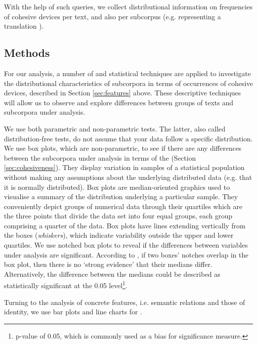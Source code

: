 \documentclass[output=paper]{langsci/langscibook.cls}
\begin{document}
With the help of such queries, we collect distributional information on frequencies of cohesive devices per text, and also per subcorpus (e.g. representing a translation ).



\subsection{Methods}\label{sec:method}

For our analysis, a number of  and statistical techniques are applied to investigate the dis\-tri\-bu\-tional characteristics of subcorpora in terms of occurrences of cohesive devices, described in Section \ref{sec:features} above. These descriptive techniques will allow us to observe and explore differences between groups of texts and subcorpora under analysis.

We use both parametric and non-parametric tests. The latter, also called dis\-tri\-bu\-tion-free tests, do not assume that your data follow a specific distribution. We use box plots, which are non-parametric, to see if there are any differences between the subcorpora under analysis in terms of the  (Section \ref{sec:cohesiveness}). They display variation in samples of a statistical population without making any assumptions about the underlying distributed data (e.g. that it is normally distributed). Box plots are median-oriented graphics used to visualise a summary of the distribution underlying a particular sample. They conveniently depict groups of numerical data through their quartiles which are the three points that divide the data set into four equal groups, each group comprising a quarter of the data. Box plots have lines extending vertically from the boxes (\textsl{whiskers}), which indicate variability outside the upper and lower quartiles. We use notched box plots to reveal if the differences between variables under analysis are significant. According to \citet{ChambersEtAl1983}, if two boxes' notches overlap in the box plot, then there is no `strong evidence' that their medians differ. %
Alternatively, the difference between the medians could be described as statistically significant at the 0.05 level\footnote{p-value of 0.05, which is commonly used as a bias for significance measure.}.
 
Turning to the analysis of concrete features, i.e. semantic relations and those of identity, we use bar plots and line charts for .
\end{document}

